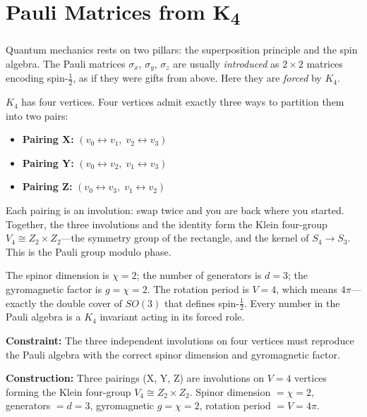 \documentclass[11pt,a4paper]{book}
\def\mathbb#1{#1}%
\newcommand{\VoidRef}[2]{\textit{#2} (in \textit{Void})}
\begin{document}
\chapter{Pauli Matrices from K\textsubscript{4}}
\label{ch:pauli-matrices}

Quantum mechanics rests on two pillars: the superposition principle and the spin algebra. The Pauli matrices $\sigma_x$, $\sigma_y$, $\sigma_z$ are usually \emph{introduced} as $2 \times 2$ matrices encoding spin-$\frac{1}{2}$, as if they were gifts from above. Here they are \emph{forced} by $K_4$.

$K_4$ has four vertices. Four vertices admit exactly three ways to partition them into two pairs:
\begin{itemize}
  \item \textbf{Pairing X:} $(v_0 \leftrightarrow v_1,\; v_2 \leftrightarrow v_3)$
  \item \textbf{Pairing Y:} $(v_0 \leftrightarrow v_2,\; v_1 \leftrightarrow v_3)$
  \item \textbf{Pairing Z:} $(v_0 \leftrightarrow v_3,\; v_1 \leftrightarrow v_2)$
\end{itemize}

Each pairing is an involution: swap twice and you are back where you started. Together, the three involutions and the identity form the Klein four-group $V_4 \cong \mathbb{Z}_2 \times \mathbb{Z}_2$---the symmetry group of the rectangle, and the kernel of $S_4 \to S_3$. This is the Pauli group modulo phase.

The spinor dimension is $\chi = 2$; the number of generators is $d = 3$; the gyromagnetic factor is $g = \chi = 2$. The rotation period is $V = 4$, which means $4\pi$---exactly the double cover of $SO(3)$ that defines spin-$\frac{1}{2}$. Every number in the Pauli algebra is a $K_4$ invariant acting in its forced role.


\textbf{Constraint:} The three independent involutions on four vertices must reproduce the Pauli algebra with the correct spinor dimension and gyromagnetic factor.

\textbf{Construction:} Three pairings (X, Y, Z) are involutions on $V = 4$ vertices forming the Klein four-group $V_4 \cong \mathbb{Z}_2 \times \mathbb{Z}_2$. Spinor dimension $= \chi = 2$, generators $= d = 3$, gyromagnetic $g = \chi = 2$, rotation period $= V = 4\pi$.
\end{document}
